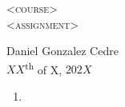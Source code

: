 \documentclass[12pt, a4paper]{article}
\begin{document}
\begin{center}
    \textsc{\huge <course>}\\
    \textsc{\large <assignment>}\\
\end{center}
\begin{flushright}
    Daniel Gonzalez Cedre\\
    $XX$\textsuperscript{th} of X, $202X$
\end{flushright}

\begin{enumerate}
    \item
\end{enumerate}
\end{document}
